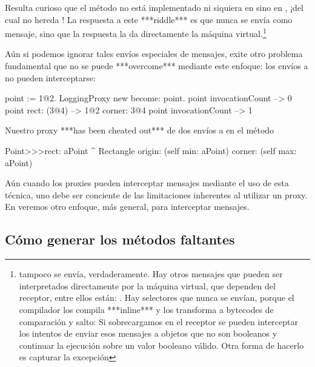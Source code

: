 \documentclass[a4paper,10pt,twoside]{book}
\begin{document}
Resulta curioso que el método  no está implementado ni
siquiera en  sino en , ¡del cual no hereda
!  La respuesta a este ***riddle*** es que 
nunca se envía como mensaje, sino que la respuesta la da directamente
la máquina virtual.\footnote{ tampoco se envía,
  verdaderamente.  Hay otros mensajes que pueden ser interpretados
  directamente por la máquina virtual, que dependen del receptor,
  entre ellos están:
\ct{+- < > <= >= = ~= * / \ ==}
.
Hay selectores que nunca se envían, porque el compilador los compila
***inline*** y los transforma a bytecodes de comparación y salto:
Si sobrecargamos  en el receptor se pueden
interceptar los intentos de enviar esos mensajes a objetos que no son
booleanos y continuar la ejecución sobre un valor booleano válido.
Otra forma de hacerlo es capturar la excepción
}%

Aún si podemos ignorar tales envíos especiales de mensajes, exite otro
problema fundamental que no se puede ***overcome*** mediante este
enfoque:  los envíos a \self no pueden interceptarse:
\begin{code}{}
point := 1@2.
LoggingProxy new become: point.
point invocationCount --> 0
point rect: (3@4)        --> 1@2 corner: 3@4
point invocationCount --> 1
\end{code}

Nuestro proxy ***has been cheated out*** de dos envíos a \self en el
método 
\begin{code}{}
Point>>>rect: aPoint
        ^ Rectangle  origin: (self min: aPoint) corner: (self max: aPoint)
\end{code}

Aún cuando los proxies pueden interceptar mensajes mediante el uso de
esta técnica, uno debe ser conciente de las limitaciones inherentes al
utilizar un proxy.  En  veremos otro enfoque, más
general, para interceptar mensajes.

\subsection{Cómo generar los métodos faltantes}
\end{document}
